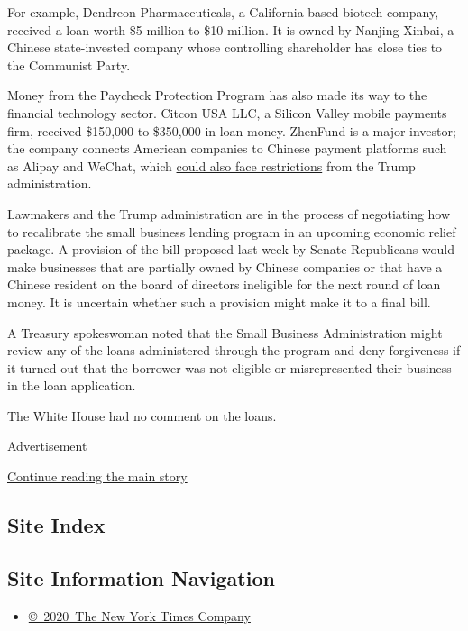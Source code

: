 For example, Dendreon Pharmaceuticals, a California-based biotech
company, received a loan worth \$5 million to \$10 million. It is owned
by Nanjing Xinbai, a Chinese state-invested company whose controlling
shareholder has close ties to the Communist Party.

Money from the Paycheck Protection Program has also made its way to the
financial technology sector. Citcon USA LLC, a Silicon Valley mobile
payments firm, received \$150,000 to \$350,000 in loan money. ZhenFund
is a major investor; the company connects American companies to Chinese
payment platforms such as Alipay and WeChat, which
\href{https://www.nytimes.com/2020/07/15/technology/tiktok-washington-lobbyist.html}{could
also face restrictions} from the Trump administration.

Lawmakers and the Trump administration are in the process of negotiating
how to recalibrate the small business lending program in an upcoming
economic relief package. A provision of the bill proposed last week by
Senate Republicans would make businesses that are partially owned by
Chinese companies or that have a Chinese resident on the board of
directors ineligible for the next round of loan money. It is uncertain
whether such a provision might make it to a final bill.

A Treasury spokeswoman noted that the Small Business Administration
might review any of the loans administered through the program and deny
forgiveness if it turned out that the borrower was not eligible or
misrepresented their business in the loan application.

The White House had no comment on the loans.

Advertisement

\protect\hyperlink{after-bottom}{Continue reading the main story}

\hypertarget{site-index}{%
\subsection{Site Index}\label{site-index}}

\hypertarget{site-information-navigation}{%
\subsection{Site Information
Navigation}\label{site-information-navigation}}

\begin{itemize}
\tightlist
\item
  \href{https://help.nytimes.com/hc/en-us/articles/115014792127-Copyright-notice}{©~2020~The
  New York Times Company}
\end{itemize}

